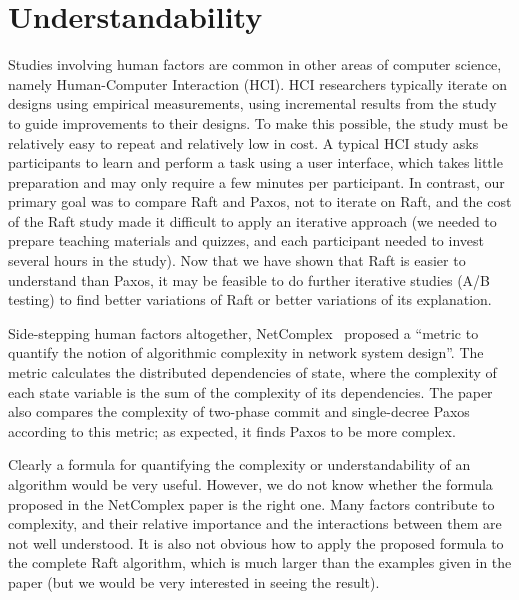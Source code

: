 \section{Understandability}
\label{related:understandability}

Studies involving human factors are common in other areas of computer
science, namely Human-Computer Interaction (HCI). HCI researchers
typically iterate on designs using empirical measurements, using
incremental results from the study to guide improvements to their
designs. To make this possible, the study must be relatively easy to
repeat and relatively low in cost. A typical HCI study asks participants
to learn and perform a task using a user interface, which takes little
preparation and may only require a few minutes per participant. In
contrast, our primary goal was to compare Raft and Paxos, not to iterate
on Raft, and the cost of the Raft study made it difficult to apply an
iterative approach (we needed to prepare teaching materials and quizzes,
and each participant needed to invest several hours in the study). Now
that we have shown that Raft is easier to understand than Paxos, it may
be feasible to do further iterative studies (A/B testing) to find better
variations of Raft or better variations of its explanation.

Side-stepping human factors altogether,
NetComplex~\cite{Chun:2008} proposed a ``metric to quantify the notion
of algorithmic complexity in network system design''. The metric
calculates the distributed dependencies of state, where the complexity
of each state variable is the sum of the complexity of its dependencies.
The paper also compares the complexity of two-phase commit and
single-decree Paxos according to this metric; as expected, it finds
Paxos to be more complex.

Clearly a formula for quantifying the complexity or understandability of
an algorithm would be very useful. However, we do not know whether the
formula proposed in the NetComplex paper is the right one. Many factors
contribute to complexity, and their relative importance and the
interactions between them are not well understood. It is also not
obvious how to apply the proposed formula to the complete Raft
algorithm, which is much larger than the examples given in the paper
(but we would be very interested in seeing the result).
